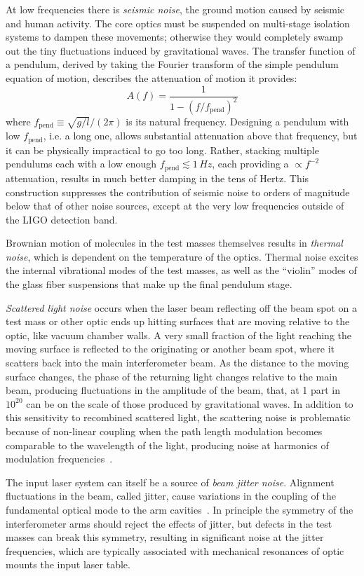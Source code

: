 At low frequencies there is \textit{seismic noise}, the ground motion caused by seismic and human activity.
The core optics must be suspended on multi-stage isolation systems to dampen these movements; otherwise they would completely swamp out the tiny fluctuations induced by gravitational waves.
The transfer function of a pendulum, derived by taking the Fourier transform of the simple pendulum equation of motion, describes the attenuation of motion it provides:
\begin{equation}
  A(f) = \frac{1}{1 - (f / f_{\mathrm{pend}})^2}
\end{equation}
where $f_{\mathrm{pend}} \equiv \sqrt{g/l} / (2\pi)$ is its natural frequency.
Designing a pendulum with low $f_{\mathrm{pend}}$, i.e. a long one, allows substantial attenuation above that frequency, but it can be physically impractical to go too long.
Rather, stacking multiple pendulums each with a low enough $f_{\mathrm{pend}} \lesssim 1\,Hz$, each providing a $\propto f^{-2}$ attenuation, results in much better damping in the tens of Hertz.
This construction suppresses the contribution of seismic noise to orders of magnitude below that of other noise sources, except at the very low frequencies outside of the LIGO detection band.

Brownian motion of molecules in the test masses themselves results in \textit{thermal noise}, which is dependent on the temperature of the optics.
Thermal noise excites the internal vibrational modes of the test masses, as well as the ``violin'' modes of the glass fiber suspensions that make up the final pendulum stage.

\textit{Scattered light noise} occurs when the laser beam reflecting off the beam spot on a test mass or other optic ends up hitting surfaces that are moving relative to the optic, like vacuum chamber walls.
A very small fraction of the light reaching the moving surface is reflected to the originating or another beam spot, where it scatters back into the main interferometer beam.
As the distance to the moving surface changes, the phase of the returning light changes relative to the main beam, producing fluctuations in the amplitude of the beam, that, at 1 part in $10^{20}$ can be on the scale of those produced by gravitational waves.
In addition to this sensitivity to recombined scattered light, the scattering noise is problematic because of non-linear coupling when the path length modulation becomes comparable to the wavelength of the light, producing noise at harmonics of modulation frequencies~\citep{Soni_2020}.

The input laser system can itself be a source of \textit{beam jitter noise}.
Alignment fluctuations in the beam, called jitter, cause variations in the coupling of the fundamental optical mode to the arm cavities~\citep{Mueller_2005, Hardwick_2019}.
In principle the symmetry of the interferometer arms should reject the effects of jitter, but defects in the test masses can break this symmetry, resulting in significant noise at the jitter frequencies, which are typically associated with mechanical resonances of optic mounts the input laser table.

